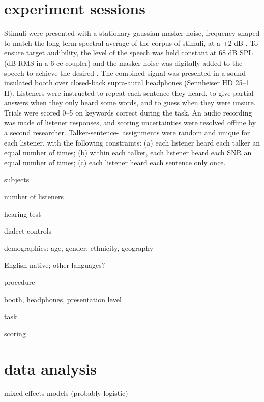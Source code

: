 \section{experiment sessions}
Stimuli were presented with a stationary gaussian masker noise, frequency shaped to match the long term spectral average of the corpus of stimuli, at a +2 dB \snr.  To ensure target audibility, the level of the speech was held constant at 68 dB SPL (dB RMS in a 6 cc coupler) and the masker noise was digitally added to the speech to achieve the desired \snr.  The combined signal was presented in a sound-insulated booth over closed-back supra-aural headphones (Sennheiser HD 25–1 II).  Listeners were instructed to repeat each sentence they heard, to give partial answers when they only heard some words, and to guess when they were unsure.  Trials were scored 0–5 on keywords correct during the task.  An audio recording was made of listener responses, and scoring uncertainties were resolved offline by a second researcher.  Talker-sentence-\snr\ assignments were random and unique for each listener, with the following constraints: (a) each listener heard each talker an equal number of times; (b) within each talker, each listener heard each SNR an equal number of times; (c) each listener heard each sentence only once.

\begin{itm}
	\item{subjects}
	\begin{itm}
		\item{number of listeners}
		\item{hearing test}
		\item{dialect controls}
		\item{demographics: age, gender, ethnicity, geography}
		\item{English native; other languages?}
	\end{itm}
	\item{procedure}
	\begin{itm}
		\item{booth, headphones, presentation level}
		\item{task}
		\item{scoring}
	\end{itm}
\end{itm}

\section{data analysis}
\begin{itm}
	\item{mixed effects models (probably logistic)}
\end{itm}
